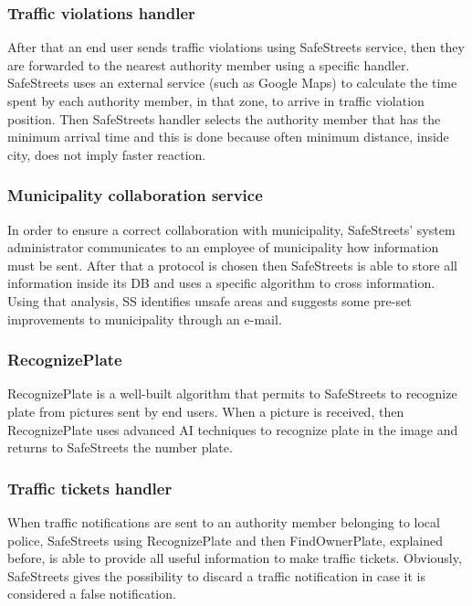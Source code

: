 \documentclass[12pt]{article}
\begin{document}
\subsubsection{Traffic violations handler}
\vspace{2mm}
After that an end user sends traffic violations using SafeStreets service, then they are forwarded to the nearest authority member using a specific handler. SafeStreets uses an external service (such as Google Maps) to calculate the time spent by each authority member, in that zone, to arrive in traffic violation position. Then SafeStreets handler selects the authority member that has the minimum arrival time and this is done because often minimum distance, inside city, does not imply faster reaction.

\subsubsection{Municipality collaboration service }
\vspace{2mm}
In order to ensure a correct collaboration with municipality, SafeStreets’ system administrator communicates to an employee of municipality how information must be sent. After that a protocol is chosen then SafeStreets is able to store all information inside its DB and uses a specific algorithm to cross information. Using that analysis, SS identifies unsafe areas and suggests some pre-set improvements to municipality through an e-mail. 
\subsubsection{RecognizePlate}
\vspace{2mm}
RecognizePlate is a well-built algorithm that permits to SafeStreets to recognize plate from pictures sent by end users. When a picture is received, then RecognizePlate uses advanced AI techniques to recognize plate in the image and returns to SafeStreets the number plate.  
\subsubsection{Traffic tickets handler}
\vspace{2mm}
When traffic notifications are sent to an authority member belonging to local police, SafeStreets using RecognizePlate and then FindOwnerPlate, explained before, is able to provide all useful information to make traffic tickets. Obviously, SafeStreets gives the possibility to discard a traffic notification in case it is considered a false notification.
\end{document}
